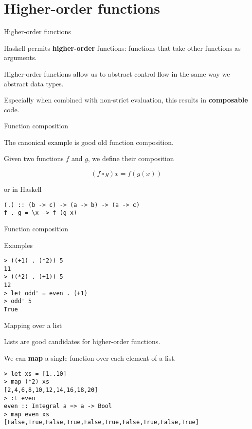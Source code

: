 
\section{Higher-order functions}

%
\begin{frame}[fragile]{Higher-order functions}

Haskell permits \textbf{higher-order} functions: functions that take other
functions as arguments.

Higher-order functions allow us to abstract control flow in the same way we
abstract data types.

Especially when combined with non-strict evaluation, this results in
\textbf{composable} code.

\end{frame}

%
\begin{frame}[fragile]{Function composition}

The canonical example is good old function composition.

Given two functions $f$ and $g$, we define their composition 

\[
(f \circ g) x = f(g(x))
\]

or in Haskell

\begin{block}{}
\begin{verbatim}
(.) :: (b -> c) -> (a -> b) -> (a -> c)
f . g = \x -> f (g x)
\end{verbatim}
\end{block}

\end{frame}

%
\begin{frame}[fragile]{Function composition}

\begin{block}{Examples}
\begin{verbatim}
> ((+1) . (*2)) 5
11
> ((*2) . (+1)) 5
12
> let odd' = even . (+1)
> odd' 5
True
\end{verbatim}
\end{block}

\end{frame}

%
\begin{frame}[fragile]{Mapping over a list}

Lists are good candidates for higher-order functions.

We can \textbf{map} a single function over each element of a list.

\begin{block}{}
\begin{verbatim}
> let xs = [1..10]
> map (*2) xs
[2,4,6,8,10,12,14,16,18,20]
> :t even
even :: Integral a => a -> Bool
> map even xs
[False,True,False,True,False,True,False,True,False,True]
\end{verbatim}
\end{block}

\end{frame}

